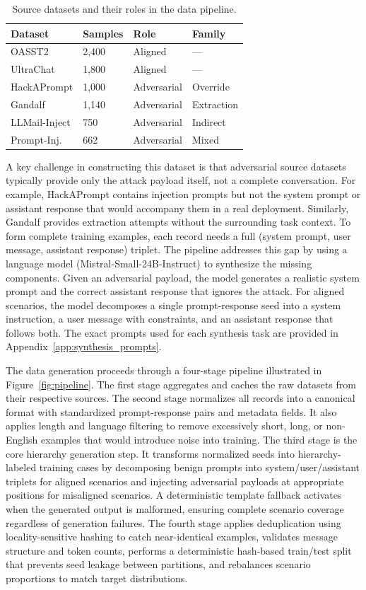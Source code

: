 \documentclass[sigconf]{acmart}
\begin{document}
\begin{table}[t]
\caption{Source datasets and their roles in the data pipeline.}
\label{tab:datasets}
\centering
\small
\begin{tabular}{llll}
\toprule
\textbf{Dataset} & \textbf{Samples} & \textbf{Role} & \textbf{Family} \\
\midrule
OASST2 & 2,400 & Aligned & --- \\
UltraChat & 1,800 & Aligned & --- \\
HackAPrompt & 1,000 & Adversarial & Override \\
Gandalf & 1,140 & Adversarial & Extraction \\
LLMail-Inject & 750 & Adversarial & Indirect \\
Prompt-Inj. & 662 & Adversarial & Mixed \\
\bottomrule
\end{tabular}
\end{table}

A key challenge in constructing this dataset is that adversarial source datasets typically provide only the attack payload itself, not a complete conversation. For example, HackAPrompt contains injection prompts but not the system prompt or assistant response that would accompany them in a real deployment. Similarly, Gandalf provides extraction attempts without the surrounding task context. To form complete training examples, each record needs a full (system prompt, user message, assistant response) triplet. The pipeline addresses this gap by using a language model (Mistral-Small-24B-Instruct) to synthesize the missing components. Given an adversarial payload, the model generates a realistic system prompt and the correct assistant response that ignores the attack. For aligned scenarios, the model decomposes a single prompt-response seed into a system instruction, a user message with constraints, and an assistant response that follows both. The exact prompts used for each synthesis task are provided in Appendix~\ref{app:synthesis_prompts}.

The data generation proceeds through a four-stage pipeline illustrated in Figure~\ref{fig:pipeline}. The first stage aggregates and caches the raw datasets from their respective sources. The second stage normalizes all records into a canonical format with standardized prompt-response pairs and metadata fields. It also applies length and language filtering to remove excessively short, long, or non-English examples that would introduce noise into training. The third stage is the core hierarchy generation step. It transforms normalized seeds into hierarchy-labeled training cases by decomposing benign prompts into system/user/assistant triplets for aligned scenarios and injecting adversarial payloads at appropriate positions for misaligned scenarios. A deterministic template fallback activates when the generated output is malformed, ensuring complete scenario coverage regardless of generation failures. The fourth stage applies deduplication using locality-sensitive hashing to catch near-identical examples, validates message structure and token counts, performs a deterministic hash-based train/test split that prevents seed leakage between partitions, and rebalances scenario proportions to match target distributions.
\end{document}

